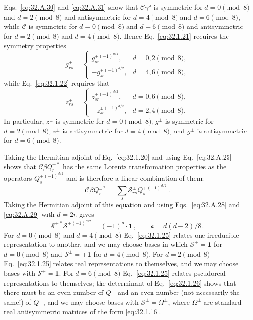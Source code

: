 Eqs.~\eqref{eq:32.A.30} and \eqref{eq:32.A.31} show that
\(\mathcal C\gamma^\lambda\) is symmetric for \(d=0\pmod 8\) and
\(d=2\pmod 8\) and antisymmetric for \(d=4\pmod 8\) and
\(d=6\pmod 8\), while \(\mathcal C\) is symmetric for \(d=0\pmod 8\)
and \(d=6\pmod 8\) and antisymmetric for \(d=2\pmod 8\) and
\(d=4\pmod 8\). Hence Eq.~\eqref{eq:32.1.21} requires the symmetry
properties
\begin{equation}
  g_{rs}^{\pm}=
  \begin{cases}
    g_{sr}^{\mp(-1)^{d/2}}, & d=0,2\pmod 8,\\
    -g_{sr}^{\mp(-1)^{d/2}}, & d=4,6\pmod 8,
  \end{cases}
  \tag{32.1.23}\label{eq:32.1.23}
\end{equation}
while Eq.~\eqref{eq:32.1.22} requires that
\begin{equation}
  z_{rs}^{\pm}=
  \begin{cases}
    z_{sr}^{\pm(-1)^{d/2}}, & d=0,6\pmod 8,\\
    -z_{sr}^{\pm(-1)^{d/2}}, & d=2,4\pmod 8.
  \end{cases}
  \tag{32.1.24}\label{eq:32.1.24}
\end{equation}
In particular, \(z^\pm\) is symmetric for \(d=0\pmod 8\), \(g^\pm\) is
symmetric for \(d=2\pmod 8\), \(z^\pm\) is antisymmetric for
\(d=4\pmod 8\), and \(g^\pm\) is antisymmetric for \(d=6\pmod 8\).

Taking the Hermitian adjoint of Eq.~\eqref{eq:32.1.20} and using
Eq.~\eqref{eq:32.A.25} shows that
\(\mathcal C\beta Q_r^{\pm*}\) has the same Lorentz transformation
properties as the operators \(Q_s^{\mp(-1)^{d/2}}\) and is therefore a
linear combination of them:
\begin{equation}
  \mathcal C\beta Q_r^{\pm*}
  =\sum_s\mathcal S_{rs}^{\pm}Q_s^{\mp(-1)^{d/2}}\,.
  \tag{32.1.25}\label{eq:32.1.25}
\end{equation}
Taking the Hermitian adjoint of this equation and using
Eqs.~\eqref{eq:32.A.28} and \eqref{eq:32.A.29} with \(d=2n\) gives
\begin{equation}
  \mathcal S^{\pm*}\mathcal S^{\mp(-1)^{d/2}}
  =(-1)^a\mathbin{\cdot}\mathbf{1}\,,
  \qquad a=d(d-2)/8\,.
  \tag{32.1.26}\label{eq:32.1.26}
\end{equation}
For \(d=0\pmod 8\) and \(d=4\pmod 8\)
Eq.~\eqref{eq:32.1.25} relates one irreducible representation to another,
and we may choose bases in which \(\mathcal S^\pm=\mathbf{1}\) for
\(d=0\pmod 8\) and \(\mathcal S^\pm=\mp\mathbf{1}\) for
\(d=4\pmod 8\). For \(d=2\pmod 8\) Eq.~\eqref{eq:32.1.25} relates real
representations to themselves, and we may choose bases with
\(\mathcal S^\pm=\mathbf{1}\). For \(d=6\pmod 8\)
Eq.~\eqref{eq:32.1.25} relates pseudoreal representations to themselves;
the determinant of Eq.~\eqref{eq:32.1.26} shows that there must be an even
number of \(Q^+\) and an even number (not necessarily the same!) of \(Q^-\),
and we may choose bases with \(\mathcal S^\pm=\Omega^\pm\), where
\(\Omega^\pm\) are standard real antisymmetric matrices of the form
\eqref{eq:32.1.16}.

